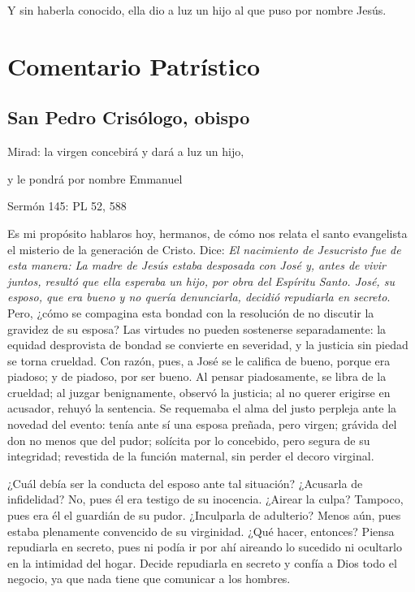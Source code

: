 Y sin haberla conocido, ella dio a luz un hijo al que puso por nombre
Jesús.



\section{Comentario Patrístico}

\subsection{San Pedro Crisólogo, obispo}

Mirad: la virgen concebirá y dará a luz un hijo,

y le pondrá por nombre Emmanuel

Sermón 145: PL 52, 588

Es mi propósito hablaros hoy, hermanos, de cómo nos relata el santo evangelista el misterio de la generación de Cristo. Dice: \emph{El nacimiento de Jesucristo fue de esta manera: La madre de Jesús estaba desposada con José y, antes de vivir juntos, resultó que ella esperaba un hijo, por obra del Espíritu Santo. José, su esposo, que era bueno y no quería denunciarla, decidió repudiarla en secreto}. Pero, ¿cómo se compagina esta bondad con la resolución de no discutir la gravidez de su esposa? Las virtudes no pueden sostenerse separadamente: la equidad desprovista de bondad se convierte en severidad, y la justicia sin piedad se torna crueldad. Con razón, pues, a José se le califica de bueno, porque era piadoso; y de piadoso, por ser bueno. Al pensar piadosamente, se libra de la crueldad; al juzgar benignamente, observó la justicia; al no querer erigirse en acusador, rehuyó la sentencia. Se requemaba el alma del justo perpleja ante la novedad del evento: tenía ante sí una esposa preñada, pero virgen; grávida del don no menos que del pudor; solícita por lo concebido, pero segura de su integridad; revestida de la función maternal, sin perder el decoro virginal.

¿Cuál debía ser la conducta del esposo ante tal situación? ¿Acusarla de infidelidad? No, pues él era testigo de su inocencia. ¿Airear la culpa? Tampoco, pues era él el guardián de su pudor. ¿Inculparla de adulterio? Menos aún, pues estaba plenamente convencido de su virginidad. ¿Qué hacer, entonces? Piensa repudiarla en secreto, pues ni podía ir por ahí aireando lo sucedido ni ocultarlo en la intimidad del hogar. Decide repudiarla en secreto y confía a Dios todo el negocio, ya que nada tiene que comunicar a los hombres.

